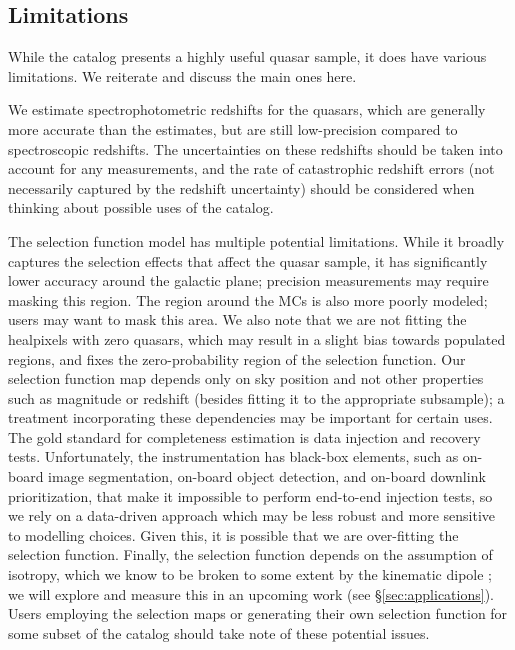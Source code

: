 \subsection{Limitations}
\label{sec:limitations}

While the \cat catalog presents a highly useful quasar sample, it does have various limitations.
We reiterate and discuss the main ones here.

We estimate spectrophotometric redshifts for the quasars, which are generally more accurate than the \Gaia estimates, but are still low-precision compared to spectroscopic redshifts. 
The uncertainties on these redshifts should be taken into account for any measurements, and the rate of catastrophic redshift errors (not necessarily captured by the redshift uncertainty) should be considered when thinking about possible uses of the catalog.

The selection function model has multiple potential limitations. 
While it broadly captures the selection effects that affect the quasar sample, it has significantly lower accuracy around the galactic plane; precision measurements may require masking this region.
The region around the MCs is also more poorly modeled; users may want to mask this area.
We also note that we are not fitting the healpixels with zero quasars, which may result in a slight bias towards populated regions, and fixes the zero-probability region of the selection function.
Our selection function map depends only on sky position and not other properties such as magnitude or redshift (besides fitting it to the appropriate subsample); a treatment incorporating these dependencies may be important for certain uses.
The gold standard for completeness estimation is data injection and recovery tests.
Unfortunately, the \Gaia instrumentation has black-box elements, such as on-board image segmentation, on-board object detection, and on-board downlink prioritization, that make it impossible to perform end-to-end injection tests, so we rely on a data-driven approach which may be less robust and more sensitive to modelling choices.
Given this, it is possible that we are over-fitting the selection function.
Finally, the selection function depends on the assumption of isotropy, which we know to be broken to some extent by the kinematic dipole \citep{stewart_peculiar_1967, secrest_test_2021}; we will explore and measure this in an upcoming work (see \S\ref{sec:applications}).
Users employing the selection maps or generating their own selection function for some subset of the catalog should take note of these potential issues.

